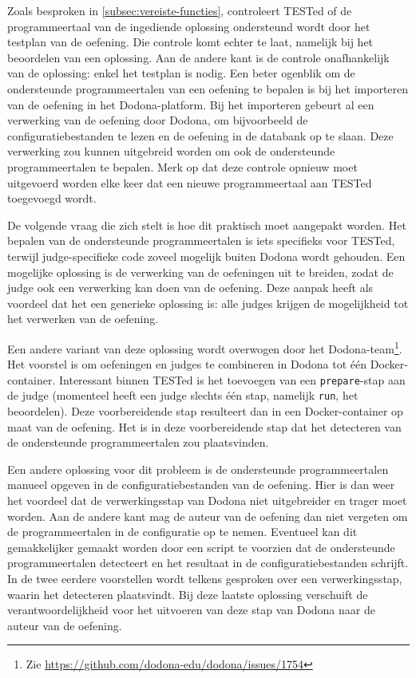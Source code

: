 Zoals besproken in \cref{subsec:vereiste-functies}, controleert TESTed of de programmeertaal van de ingediende oplossing ondersteund wordt door het testplan van de oefening.
Die controle komt echter te laat, namelijk bij het beoordelen van een oplossing.
Aan de andere kant is de controle onafhankelijk van de oplossing: enkel het testplan is nodig.
Een beter ogenblik om de ondersteunde programmeertalen van een oefening te bepalen is bij het importeren van de oefening in het Dodona-platform.
Bij het importeren gebeurt al een verwerking van de oefening door Dodona, om bijvoorbeeld de configuratiebestanden te lezen en de oefening in de databank op te slaan.
Deze verwerking zou kunnen uitgebreid worden om ook de ondersteunde programmeertalen te bepalen.
Merk op dat deze controle opnieuw moet uitgevoerd worden elke keer dat een nieuwe programmeertaal aan TESTed toegevoegd wordt.

De volgende vraag die zich stelt is hoe dit praktisch moet aangepakt worden.
Het bepalen van de ondersteunde programmeertalen is iets specifieks voor TESTed, terwijl judge-specifieke code zoveel mogelijk buiten Dodona wordt gehouden.
Een mogelijke oplossing is de verwerking van de oefeningen uit te breiden, zodat de judge ook een verwerking kan doen van de oefening.
Deze aanpak heeft als voordeel dat het een generieke oplossing is: alle judges krijgen de mogelijkheid tot het verwerken van de oefening.

Een andere variant van deze oplossing wordt overwogen door het Dodona-team\footnote{Zie \url{https://github.com/dodona-edu/dodona/issues/1754}}.
Het voorstel is om oefeningen en judges te combineren in Dodona tot één Docker-container.
Interessant binnen TESTed is het toevoegen van een \texttt{prepare}-stap aan de judge (momenteel heeft een judge slechts één stap, namelijk \texttt{run}, het beoordelen).
Deze voorbereidende stap resulteert dan in een Docker-container op maat van de oefening.
Het is in deze voorbereidende stap dat het detecteren van de ondersteunde programmeertalen zou plaatsvinden.

Een andere oplossing voor dit probleem is de ondersteunde programmeertalen manueel opgeven in de configuratiebestanden van de oefening.
Hier is dan weer het voordeel dat de verwerkingsstap van Dodona niet uitgebreider en trager moet worden.
Aan de andere kant mag de auteur van de oefening dan niet vergeten om de programmeertalen in de configuratie op te nemen.
Eventueel kan dit gemakkelijker gemaakt worden door een script te voorzien dat de ondersteunde programmeertalen detecteert en het resultaat in de configuratiebestanden schrijft.
In de twee eerdere voorstellen wordt telkens gesproken over een verwerkingsstap, waarin het detecteren plaatsvindt.
Bij deze laatste oplossing verschuift de verantwoordelijkheid voor het uitvoeren van deze stap van Dodona naar de auteur van de oefening.

